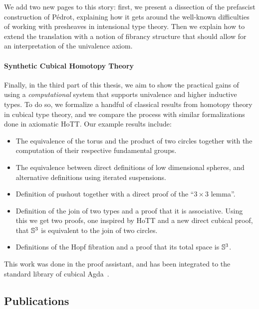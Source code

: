 We add two new pages to this story: first, we present a dissection of 
the prefascist construction of Pédrot, explaining how it gets around the well-known 
difficulties of working with presheaves in intensional type theory.
% 
Then we explain how to extend the translation with a notion of 
fibrancy structure that should allow for an interpretation of the univalence
axiom.

\paragraph{Synthetic Cubical Homotopy Theory}
% 
Finally, in the third part of this thesis, we aim to show the practical 
gains of using a \emph{computational} system that supports univalence and 
higher inductive types. 
% 
To do so, we formalize a handful of classical results from homotopy theory 
in cubical type theory, and we compare the process with similar formalizations
done in axiomatic HoTT.
% 
Our example results include:
%
\begin{itemize}
\item The equivalence of the torus and the product of two circles together with the
  computation of their respective fundamental groups.
\item The equivalence between direct definitions of low dimensional
  spheres, and alternative definitions using iterated suspensions.
\item Definition of pushout together with a direct proof of the ``$3
  \times 3$ lemma''.
\item Definition of the join of two types and a proof that it is
  associative. Using this we get two proofs, one
  inspired by HoTT and a new direct cubical proof, that $\mathbb{S}^3$ is
  equivalent to the join of two circles.
\item Definitions of the Hopf fibration and a proof that its total
  space is $\mathbb{S}^3$.
\end{itemize}

This work was done in the \Agda proof assistant, and has been integrated to the
standard library of cubical Agda~.

\subsection{Publications}

